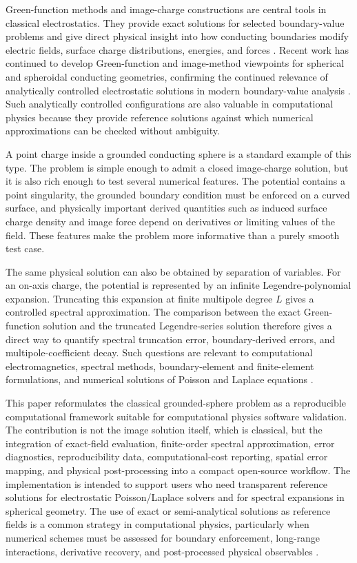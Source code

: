 \documentclass[preprint,12pt]{elsarticle}
\begin{document}
Green-function methods and image-charge constructions are central tools in classical electrostatics. They provide exact solutions for selected boundary-value problems and give direct physical insight into how conducting boundaries modify electric fields, surface charge distributions, energies, and forces \cite{jackson1999,zangwill2013,reitz2008,stratton1941,landau1984}. Recent work has continued to develop Green-function and image-method viewpoints for spherical and spheroidal conducting geometries, confirming the continued relevance of analytically controlled electrostatic solutions in modern boundary-value analysis \cite{deoliveira2012,goldstein2018,vucic2026}. Such analytically controlled configurations are also valuable in computational physics because they provide reference solutions against which numerical approximations can be checked without ambiguity.

A point charge inside a grounded conducting sphere is a standard example of this type. The problem is simple enough to admit a closed image-charge solution, but it is also rich enough to test several numerical features. The potential contains a point singularity, the grounded boundary condition must be enforced on a curved surface, and physically important derived quantities such as induced surface charge density and image force depend on derivatives or limiting values of the field. These features make the problem more informative than a purely smooth test case.

The same physical solution can also be obtained by separation of variables. For an on-axis charge, the potential is represented by an infinite Legendre-polynomial expansion. Truncating this expansion at finite multipole degree $L$ gives a controlled spectral approximation. The comparison between the exact Green-function solution and the truncated Legendre-series solution therefore gives a direct way to quantify spectral truncation error, boundary-derived errors, and multipole-coefficient decay. Such questions are relevant to computational electromagnetics, spectral methods, boundary-element and finite-element formulations, and numerical solutions of Poisson and Laplace equations \cite{beer2008,liu2010,jin2014,cheng2005,canuto2007,boyd2001,gottlieb1977,trefethen2000,trefethen2019,pittino2014}.

This paper reformulates the classical grounded-sphere problem as a reproducible computational framework suitable for computational physics software validation. The contribution is not the image solution itself, which is classical, but the integration of exact-field evaluation, finite-order spectral approximation, error diagnostics, reproducibility data, computational-cost reporting, spatial error mapping, and physical post-processing into a compact open-source workflow. The implementation is intended to support users who need transparent reference solutions for electrostatic Poisson/Laplace solvers and for spectral expansions in spherical geometry. The use of exact or semi-analytical solutions as reference fields is a common strategy in computational physics, particularly when numerical schemes must be assessed for boundary enforcement, long-range interactions, derivative recovery, and post-processed physical observables \cite{mazars2011,westerberg2023,dantchev2023}.
\end{document}
